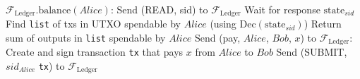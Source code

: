 \hrulefill
\ \\ 
  \label{alg:temp:formalfledger}
  \begin{algorithmic}[1]
    \State $\mathcal{F}_{\mathrm{Ledger}}\mathrm{.balance}\left(Alice\right)$:
    \State
    \State Send (READ, sid) to $\mathcal{F}_{\mathrm{Ledger}}$ 
    \State Wait for response $\mathrm{state}_{sid}$
    \State Find \texttt{list} of txs in UTXO spendable by $Alice$ (using
    $\mathrm{Dec}\left(\mathrm{state}_{sid}\right)$) 
    \State Return sum of outputs in \texttt{list} spendable by $Alice$ 
    \State
    \State
    \State Send (pay, $Alice$, $Bob$, $x$) to $\mathcal{F}_{\mathrm{Ledger}}$:
    \State
    \State Create and sign transaction \texttt{tx} that pays $x$ from $Alice$ to $Bob$
    \State Send (SUBMIT, $sid_{Alice}$ \texttt{tx}) to $\mathcal{F}_{\mathrm{Ledger}}$
  \end{algorithmic}
\hrulefill
